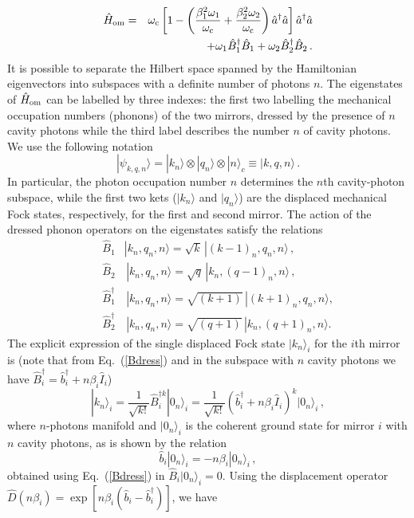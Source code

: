 \documentclass[aps,pra,twocolumn,floatfix,longbibliography, superscriptaddress]{revtex4-1}
\newcommand{\ket}[1]{|#1\rangle}
\newcommand{\nn}{\nonumber}
\renewcommand{\eqref}[1]{\mbox{Eq.~(\ref{#1})}}
\newcommand{\be}{\begin{equation}}
\newcommand{\ee}{\end{equation}}
\newcommand{\bea}{\begin{eqnarray}}
\newcommand{\eea}{\end{eqnarray}}
\begin{document}
\bea
\hat H_{\rm om}= &&\omega_{\rm c}\left[1-\left(\frac{\beta_1^2\omega_1}{\omega_{\rm c}}+
\frac{\beta_2^2\omega_2}{\omega_{\rm c}}\right)
\hat a^\dag \hat a\right]\hat a^\dag \hat a 
\\ \nn  &&+\omega_{1} \hat B_1^\dag \hat B_1 +\omega_{2} \hat B_2^\dag \hat B_2\, .
\eea
It is possible to separate the Hilbert space spanned by the Hamiltonian eigenvectors into subspaces with a definite number of photons $n$.
The eigenstates of $\hat H_{\rm om}$ can be labelled by three indexes: the first two labelling the mechanical occupation  numbers (phonons) of the two mirrors, dressed by the presence of $n$ cavity photons while the third label describes the number $n$ of cavity photons. We use the following notation
%
\be
\ket{\psi_{k,q,n}}=\ket{k_n} \otimes\ket{q_n} \otimes  \ket{n}_c \equiv \ket{k,q,n} \,. 
\ee
In particular, the  photon occupation number $n$ determines the $n$th cavity-photon subspace, while the first two kets ($|k_n \rangle$ and $|q_n \rangle$) are the displaced mechanical Fock  states, respectively, for the first and second  mirror.
The action of the dressed phonon operators on the eigenstates satisfy 
the relations
\bea
&\hat B_1& \ket{k_n,q_n,n}=\sqrt{k}\, \ket{(k-1)_n,q_n,n}\, ,\\ \nn  &\hat B_2&\, \ket{k_n,q_n,n}=\sqrt{q}\, \ket{k_n,(q-1)_n,n}\, ,\\ \nn
& \hat B_1^\dag&\,  \ket{k_n,q_n,n}=\sqrt{(k+1)}\, \ket{(k+1)_n,q_n,n} ,\\ \nn \quad &\hat B_2^\dag&\, \ket{k_n,q_n,n}=\sqrt{(q+1)}\, \ket{k_n,(q+1)_n,n}.
\eea
The explicit expression of the single displaced Fock state $|k_n \rangle_i$ for the $i$th mirror  is (note that from \eqref{Bdress} and in the subspace with $n$ cavity photons we have $\hat B^\dag_i=\hat b^\dag_i +n\beta_i \hat I_i$)
\be \label{kn}
| k_n \rangle_i
=\frac{1}{\sqrt {k!}}\hat B_i^{\dag k}|0_n\rangle_i
=
\frac{1}{\sqrt {k!}}(\hat b^\dag_i +n\beta_i \hat I_i)^k |0_n\rangle_i 
\, ,
\ee
where $n$-photons manifold and
$|0_n\rangle_i$ is the coherent ground state for mirror $i$ with $n$ cavity photons, as is shown by the relation
\be\hat b_i |0_n\rangle_i=-n\beta_i |0_n\rangle_i \, ,\ee
obtained using \eqref{Bdress} in 
$\hat B_i |0_n\rangle_i=0$.
Using the displacement operator $\hat D(n \beta_i)= \exp[{n \beta_i ( \hat b_i-\hat b_i^\dag)}]$, we have
\end{document}
